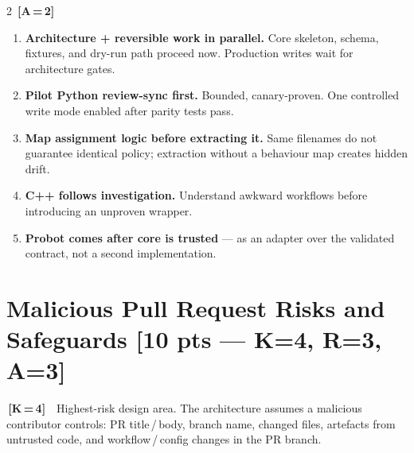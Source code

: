 \documentclass[9pt, a4paper]{article}
\newcommand{\ic}[2]{%
  {\colorbox{tag#1}{\color{white}\bfseries\fontsize{5.5}{6.5}\selectfont\,[#1\,=\,#2]\,}}%
}
\DeclareRobustCommand{\mb}[1]{%
  \texorpdfstring{\hfill{\fontsize{6.5}{7}\selectfont\color{hieroGray}[#1]}}{}%
}
\begin{document}
\begin{multicols}{2}
\ic{A}{2}
\begin{enumerate}
  \item \textbf{Architecture + reversible work in parallel.} Core skeleton, schema, fixtures,
        and dry-run path proceed now. Production writes wait for architecture gates.
  \item \textbf{Pilot Python review-sync first.} Bounded, canary-proven. One controlled write
        mode enabled after parity tests pass.
  \item \textbf{Map assignment logic before extracting it.} Same filenames do not guarantee
        identical policy; extraction without a behaviour map creates hidden drift.
  \item \textbf{C++ follows investigation.} Understand awkward workflows before introducing
        an unproven wrapper.
  \item \textbf{Probot comes after core is trusted} — as an adapter over the validated
        contract, not a second implementation.
\end{enumerate}

\section{Malicious Pull Request Risks and Safeguards \mb{10 pts — K=4, R=3, A=3}}

\ic{K}{4}\ Highest-risk design area. The architecture assumes a malicious contributor controls:
PR title\,/\,body, branch name, changed files, artefacts from untrusted code, and
workflow\,/\,config changes in the PR branch.


\end{multicols}
\end{document}
